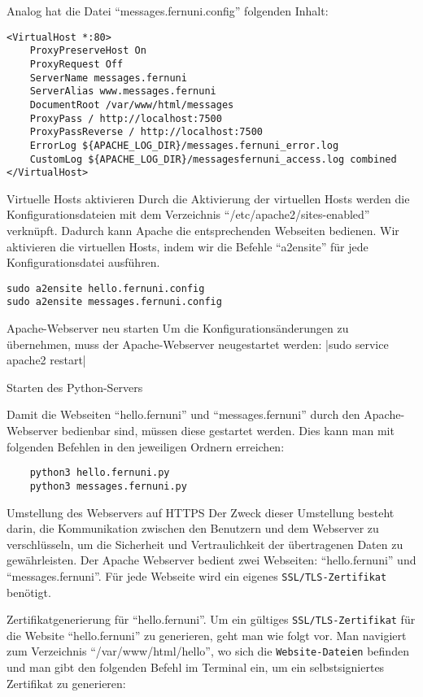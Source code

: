 Analog hat die Datei \enquote{messages.fernuni.config} folgenden Inhalt:
\begin{verbatim}
<VirtualHost *:80> 
    ProxyPreserveHost On
    ProxyRequest Off
    ServerName messages.fernuni 
    ServerAlias www.messages.fernuni 
    DocumentRoot /var/www/html/messages
    ProxyPass / http://localhost:7500
    ProxyPassReverse / http://localhost:7500
    ErrorLog ${APACHE_LOG_DIR}/messages.fernuni_error.log
    CustomLog ${APACHE_LOG_DIR}/messagesfernuni_access.log combined
</VirtualHost>
\end{verbatim}

Virtuelle Hosts aktivieren
Durch die Aktivierung der virtuellen Hosts werden die Konfigurationsdateien mit dem Verzeichnis \enquote{/etc/apache2/sites-enabled} verknüpft. Dadurch kann Apache die entsprechenden Webseiten bedienen.
Wir aktivieren die virtuellen Hosts, indem wir die Befehle \enquote{a2ensite} für jede Konfigurationsdatei ausführen.

\begin{verbatim}
sudo a2ensite hello.fernuni.config
sudo a2ensite messages.fernuni.config
\end{verbatim}

Apache-Webserver neu starten
Um die Konfigurationsänderungen zu übernehmen, muss der Apache-Webserver neugestartet werden:
|sudo service apache2 restart|

Starten des Python-Servers

Damit die Webseiten \enquote{hello.fernuni} und \enquote{messages.fernuni} durch den Apache-Webserver bedienbar sind, müssen diese gestartet werden. Dies kann man mit folgenden Befehlen in den jeweiligen Ordnern erreichen:

\begin{verbatim}
    python3 hello.fernuni.py
    python3 messages.fernuni.py
\end{verbatim}

Umstellung des Webservers auf HTTPS 
Der Zweck dieser Umstellung besteht darin, die Kommunikation zwischen den Benutzern und dem Webserver zu verschlüsseln, um die Sicherheit und Vertraulichkeit der übertragenen Daten zu gewährleisten. Der Apache Webserver bedient zwei Webseiten: \enquote{hello.fernuni} und \enquote{messages.fernuni}. Für jede Webseite wird ein eigenes \verb+SSL/TLS-Zertifikat+ benötigt.

Zertifikatgenerierung für \enquote{hello.fernuni}.
Um ein gültiges \verb+SSL/TLS-Zertifikat+ für die Website \enquote{hello.fernuni} zu generieren, geht man wie folgt vor.
Man navigiert zum Verzeichnis \enquote{/var/www/html/hello}, wo sich die \verb+Website-Dateien+ befinden und man gibt den folgenden Befehl im Terminal ein, um ein selbstsigniertes Zertifikat zu generieren:

